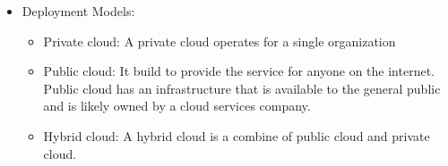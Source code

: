 \begin{itemize}
\item Deployment Models:
	\begin{itemize}
		\item Private cloud: A private cloud operates for a single organization
		\item Public cloud: It build to provide the service for anyone on the internet. Public cloud has an infrastructure that is available to the general public and is likely owned by a cloud services company.  
		\item Hybrid cloud: A hybrid cloud is a combine of public cloud and private cloud.
	\end{itemize}
\end{itemize}